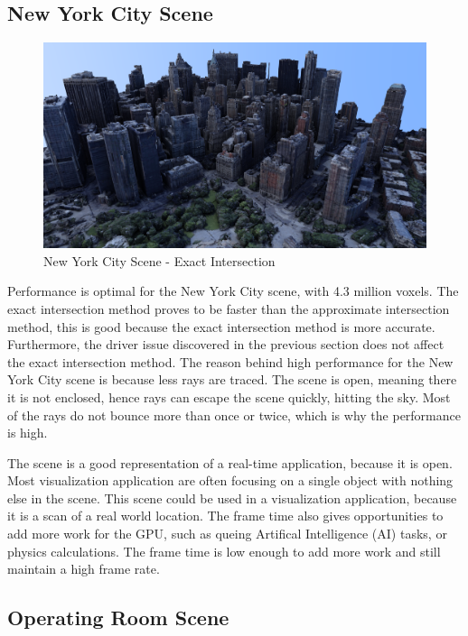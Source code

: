 \documentclass[12pt]{article}
\begin{document}
\subsection{New York City Scene}

\begin{figure}[H]
    \begin{center}
        \includegraphics[scale=0.25]{NewYorkCity}
    \end{center}
    \caption{New York City Scene - Exact Intersection}
    \label{fig:NewYorkCity}
\end{figure}

Performance is optimal for the New York City scene, with 4.3 million voxels.
The exact intersection method proves to be faster than the approximate intersection method,
this is good because the exact intersection method is more accurate. Furthermore, the driver
issue discovered in the previous section does not affect the exact intersection method.
The reason behind high performance for the New York City scene is because less rays are traced.
The scene is open, meaning there it is not enclosed, hence rays can escape the scene quickly,
hitting the sky. Most of the rays do not bounce more than once or twice, which is why the performance is high.

The scene is a good representation of a real-time application, because it is open.
Most visualization application are often focusing on a single object with nothing else in the scene.
This scene could be used in a visualization application, because it is a scan of a real world location.
The frame time also gives opportunities to add more work for the GPU, such as queing Artifical Intelligence (AI) tasks,
or physics calculations. The frame time is low enough to add more work and still maintain a high frame rate.

\subsection{Operating Room Scene}
\end{document}
